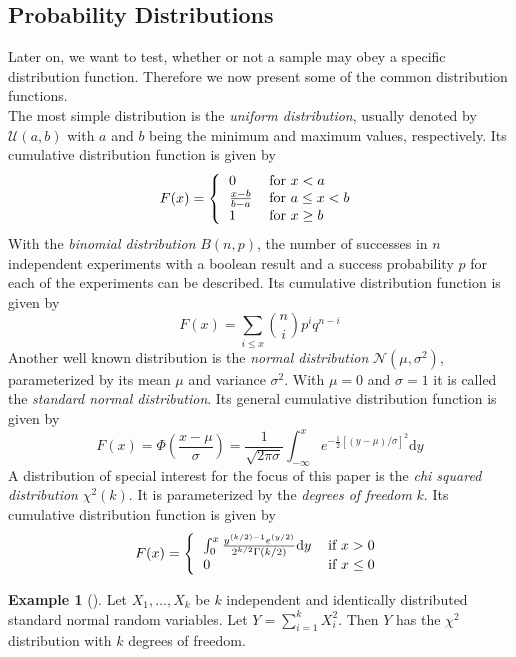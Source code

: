 \documentclass{article}
\theoremstyle{definition}
\newtheorem*{example}{Example}
\begin{document}
\subsection{Probability Distributions}
Later on, we want to test, whether or not a sample may obey a specific distribution function.
Therefore we now present some of the common distribution functions.
\\
The most simple distribution is the \emph{uniform distribution}, usually denoted by $\mathcal{U}(a,b)$ with $a$ and $b$ being the minimum and maximum values, respectively.
Its cumulative distribution function is given by 
\begin{equation}
F(x) = \left\{\begin{tabular}{ll}
0 & for $x<a$ \\
$\frac{x-b}{b-a}$ & for $a\leq x<b$ \\
1 & for $x\geq b$ \\
\end{tabular}\right.
\end{equation}
%
With the \emph{binomial distribution} $B(n,p)$, the number of successes in $n$ independent experiments with a boolean result and a success probability $p$ for each of the experiments can be described.
Its cumulative distribution function is given by
\begin{equation}
F(x) = \sum_{i\leq x} \genfrac(){0pt}{}{n}{i} p^{i}q^{n-i}
\end{equation}
%
Another well known distribution is the \emph{normal distribution} $\mathcal{N}(\mu,\sigma^2)$, parameterized by its mean $\mu$ and variance $\sigma^2$.
With $\mu = 0$ and $\sigma = 1$ it is called the \emph{standard normal distribution}.
Its general cumulative distribution function is given by
\begin{equation}
F(x) = \Phi\left(\frac{x - \mu}{\sigma}\right) = \frac{1}{\sqrt{2\pi\sigma}} \int_{-\infty}^{x}e^{-\frac{1}{2}[(y-\mu)/\sigma]^2}\textrm{d}y
\end{equation}
%
A distribution of special interest for the focus of this paper is the \emph{chi squared distribution} $\chi^2(k)$.
It is parameterized by the \emph{degrees of freedom} $k$.
Its cumulative distribution function is given by
\begin{equation}
F(x) = \left\{\begin{tabular}{ll}
$\int_{0}^{x} \frac{y^{(k/2)-1}e^{(y/2)}}{2^{k/2}\Gamma(k/2)}\textrm{d}y$ & if $x>0$ \\
0 & if $x\leq 0$
\end{tabular}\right.
\end{equation}
\begin{example}[\cite{conover1980practical}]
Let $X_1, \ldots, X_k$ be $k$ independent and identically distributed standard normal random variables. Let $Y = \sum_{i=1}^{k}X_i^2$. Then $Y$ has the $\chi^2$ distribution with $k$ degrees of freedom.
\end{example}
\end{document}
